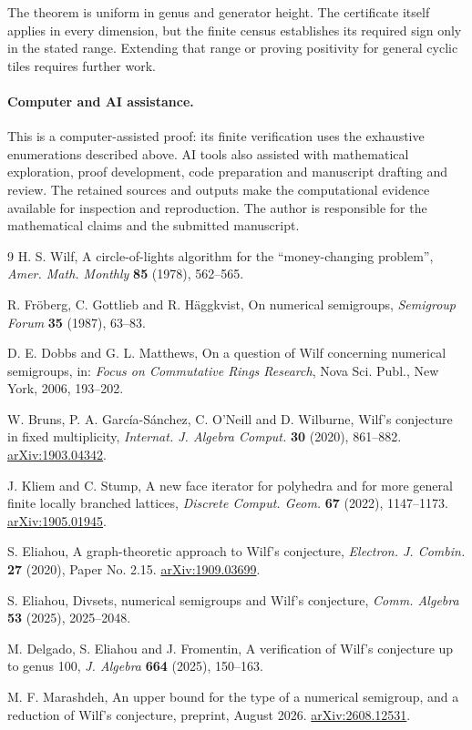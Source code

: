 \documentclass[11pt]{article}
\theoremstyle{definition}
\theoremstyle{remark}
\begin{document}
The theorem is uniform in genus and generator height. The certificate
itself applies in every dimension, but the finite census establishes
its required sign only in the stated range. Extending that range or
proving positivity for general cyclic tiles requires further work.

\paragraph{Computer and AI assistance.}
This is a computer-assisted proof: its finite verification uses the
exhaustive enumerations described above. AI tools also assisted with
mathematical exploration, proof development, code preparation and
manuscript drafting and review. The retained sources and outputs make
the computational evidence available for inspection and reproduction.
The author is responsible for the mathematical claims and the submitted
manuscript.

\begin{thebibliography}{9}
H. S. Wilf, A circle-of-lights algorithm for the ``money-changing
problem'', \emph{Amer. Math. Monthly} \textbf{85} (1978), 562--565.

R. Fr\"oberg, C. Gottlieb and R. H\"aggkvist, On numerical semigroups,
\emph{Semigroup Forum} \textbf{35} (1987), 63--83.

D. E. Dobbs and G. L. Matthews, On a question of Wilf concerning
numerical semigroups, in: \emph{Focus on Commutative Rings Research},
Nova Sci. Publ., New York, 2006, 193--202.

W. Bruns, P. A. Garc\'ia-S\'anchez, C. O'Neill and D. Wilburne,
Wilf's conjecture in fixed multiplicity,
\emph{Internat. J. Algebra Comput.} \textbf{30} (2020), 861--882.
\href{https://arxiv.org/abs/1903.04342}{arXiv:1903.04342}.

J. Kliem and C. Stump, A new face iterator for polyhedra and for more
general finite locally branched lattices,
\emph{Discrete Comput. Geom.} \textbf{67} (2022), 1147--1173.
\href{https://arxiv.org/abs/1905.01945}{arXiv:1905.01945}.

S. Eliahou, A graph-theoretic approach to Wilf's conjecture,
\emph{Electron. J. Combin.} \textbf{27} (2020), Paper No. 2.15.
\href{https://arxiv.org/abs/1909.03699}{arXiv:1909.03699}.

S. Eliahou, Divsets, numerical semigroups and Wilf's conjecture,
\emph{Comm. Algebra} \textbf{53} (2025), 2025--2048.

M. Delgado, S. Eliahou and J. Fromentin, A verification of Wilf's
conjecture up to genus 100, \emph{J. Algebra} \textbf{664} (2025), 150--163.

M. F. Marashdeh, An upper bound for the type of a numerical semigroup,
and a reduction of Wilf's conjecture, preprint, August 2026.
\href{https://arxiv.org/abs/2608.12531}{arXiv:2608.12531}.
\end{thebibliography}
\end{document}
